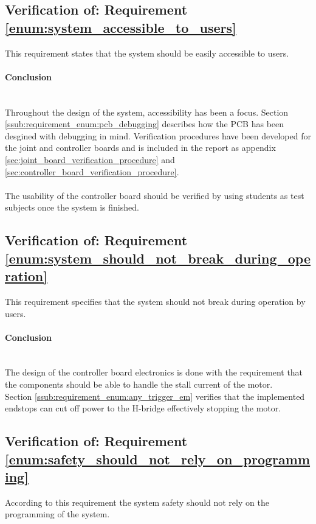 \subsection{Verification of: Requirement \ref{enum:system_accessible_to_users}} %
\label{sub:verification_of_requirement_enum:system_accessible_to_users}
This requirement states that the system should be easily accessible to users.

\paragraph{Conclusion}~\\
Throughout the design of the system, accessibility has been a focus.
Section \ref{ssub:requirement_enum:pcb_debugging} describes how the PCB has been desgined with debugging in mind.
Verification procedures have been developed for the joint and controller boards and is included in the report as appendix \ref{sec:joint_board_verification_procedure} and \ref{sec:controller_board_verification_procedure}.
\\~\\
The usability of the controller board should be verified by using students as test subjects once the system is finished. 

\subsection{Verification of: Requirement \ref{enum:system_should_not_break_during_operation}} %
\label{sub:verification_of_requirement_enum:system_should_not_break_during_operation}
This requirement specifies that the system should not break during operation by users.

\paragraph{Conclusion}~\\
The design of the controller board electronics is done with the requirement that the components should be able to handle the stall current of the motor.
\\
Section \ref{ssub:requirement_enum:any_trigger_em} verifies that the implemented endstops can cut off power to the H-bridge effectively stopping the motor.

\subsection{Verification of: Requirement \ref{enum:safety_should_not_rely_on_programming}} %
\label{sub:verification_of_requirement_enum:safety_should_not_rely_on_programming}
According to this requirement the system safety should not rely on the programming of the system.

